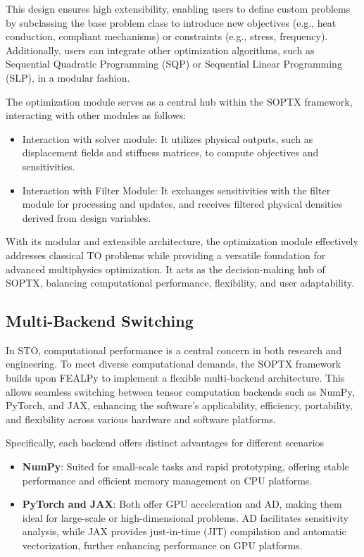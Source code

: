 \documentclass[mathpazo]{cicp}
\begin{document}
This design ensures high extensibility, enabling users to define custom problems by subclassing the base problem class to introduce new objectives (e.g., heat conduction, compliant mechanisms) or constraints (e.g., stress, frequency). Additionally, users can integrate other optimization algorithms, such as Sequential Quadratic Programming (SQP) or Sequential Linear Programming (SLP), in a modular fashion.

The optimization module serves as a central hub within the SOPTX framework, interacting with other modules as follows:
\begin{itemize}
	\item Interaction with solver module: It utilizes physical outputs, such as displacement fields and stiffness matrices, to compute objectives and sensitivities.
	\item Interaction with Filter Module: It exchanges sensitivities with the filter module for processing and updates, and receives filtered physical densities derived from design variables.
\end{itemize}

With its modular and extensible architecture, the optimization module effectively addresses classical TO problems while providing a versatile foundation for advanced multiphysics optimization. It acts as the decision-making hub of SOPTX, balancing computational performance, flexibility, and user adaptability.

\subsection{Multi-Backend Switching}
In STO, computational performance is a central concern in both research and engineering. To meet diverse computational demands, the SOPTX framework builds upon FEALPy to implement a flexible multi-backend architecture. This allows seamless switching between tensor computation backends such as NumPy, PyTorch, and JAX, enhancing the software's applicability, efficiency, portability, and flexibility across various hardware and software platforms.

Specifically, each backend offers distinct advantages for different scenarios
\begin{itemize} 
	\item \textbf{NumPy}: Suited for small-scale tasks and rapid prototyping, offering stable performance and efficient memory management on CPU platforms.
	\item \textbf{PyTorch and JAX}: Both offer GPU acceleration and AD, making them ideal for large-scale or high-dimensional problems. AD facilitates sensitivity analysis, while JAX provides just-in-time (JIT) compilation and automatic vectorization, further enhancing performance on GPU platforms.
\end{itemize}
\end{document}
